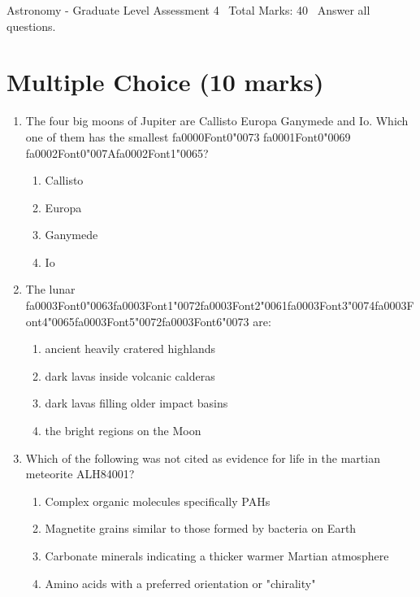 \documentclass[12pt]{article}
\begin{document}
\begin{center}
Astronomy - Graduate Level Assessment 4 \
Total Marks: 40 \
Answer all questions.
\end{center}

\section*{Multiple Choice (10 marks)}
\begin{enumerate}[label=\arabic*.]
\item The four big moons of Jupiter are Callisto Europa Ganymede and Io. Which one of them has
the smallest {\csname fa0000Font0\endcsname\char"0073} {\csname fa0001Font0\endcsname\char"0069} {\csname fa0002Font0\endcsname\char"007A}{\csname fa0002Font1\endcsname\char"0065}?
\begin{enumerate}[label=(\alph*)]
    \item Callisto
    \item Europa
    \item Ganymede
    \item Io
\end{enumerate}
\item The lunar {\csname fa0003Font0\endcsname\char"0063}{\csname fa0003Font1\endcsname\char"0072}{\csname fa0003Font2\endcsname\char"0061}{\csname fa0003Font3\endcsname\char"0074}{\csname fa0003Font4\endcsname\char"0065}{\csname fa0003Font5\endcsname\char"0072}{\csname fa0003Font6\endcsname\char"0073} are:
\begin{enumerate}[label=(\alph*)]
    \item ancient heavily cratered highlands
    \item dark lavas inside volcanic calderas
    \item dark lavas filling older impact basins
    \item the bright regions on the Moon
\end{enumerate}
\item Which of the following was not cited as evidence for life in the martian meteorite
ALH84001?
\begin{enumerate}[label=(\alph*)]
    \item Complex organic molecules specifically PAHs
    \item Magnetite grains similar to those formed by bacteria on Earth
    \item Carbonate minerals indicating a thicker warmer Martian atmosphere
    \item Amino acids with a preferred orientation or "chirality"

\end{enumerate}
\end{enumerate}
\end{document}
